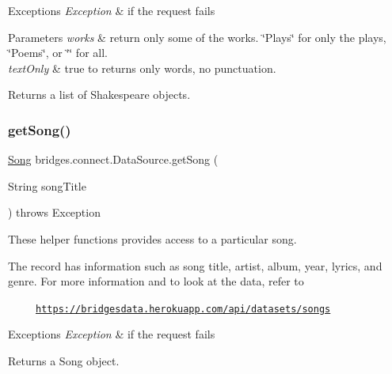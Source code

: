\begin{DoxyExceptions}{Exceptions}
{\em Exception} & if the request fails\\
\hline
\end{DoxyExceptions}

\begin{DoxyParams}{Parameters}
{\em works} & return only some of the works. \char`\"{}\+Plays\char`\"{} for only the plays, \char`\"{}\+Poems\char`\"{}, or \char`\"{}\char`\"{} for all.\\
\hline
{\em text\+Only} & true to returns only words, no punctuation.\\
\hline
\end{DoxyParams}
\begin{DoxyReturn}{Returns}
a list of Shakespeare objects. 
\end{DoxyReturn}
\mbox{\label{classbridges_1_1connect_1_1_data_source_a4f49b088703c74d68bd854d40edc5ad4}} 
\subsubsection{\texorpdfstring{get\+Song()}{getSong()}\hspace{0.1cm}{\footnotesize\ttfamily [1/2]}}
{\footnotesize\ttfamily \hyperlink{classbridges_1_1data__src__dependent_1_1_song}{Song} bridges.\+connect.\+Data\+Source.\+get\+Song (\begin{DoxyParamCaption}\item[{String}]{song\+Title }\end{DoxyParamCaption}) throws Exception}

These helper functions provides access to a particular song.

The record has information such as song title, artist, album, year, lyrics, and genre. For more information and to look at the data, refer to 

~~~~~\href{https://bridgesdata.herokuapp.com/api/datasets/songs}{\tt https\+://bridgesdata.\+herokuapp.\+com/api/datasets/songs} 


\begin{DoxyExceptions}{Exceptions}
{\em Exception} & if the request fails\\
\hline
\end{DoxyExceptions}
\begin{DoxyReturn}{Returns}
a Song object. 
\end{DoxyReturn}
\mbox{\label{classbridges_1_1connect_1_1_data_source_a935ea2005b7de3cb22c1e55027b81460}} 
